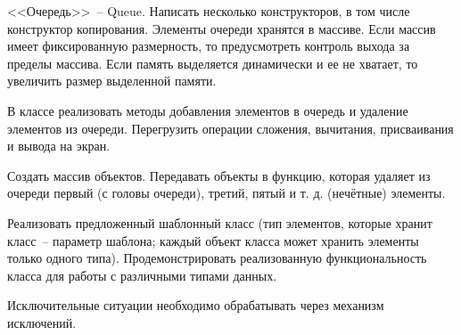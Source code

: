 
<<Очередь>>~-- Queue. Написать несколько конструкторов, в том числе конструктор
копирования. Элементы очереди хранятся в массиве. Если массив имеет фиксированную
размерность, то предусмотреть контроль выхода за пределы массива. Если память
выделяется динамически и ее не хватает, то увеличить размер выделенной памяти.

В
классе реализовать методы добавления элементов в очередь и удаление элементов из
очереди. Перегрузить операции сложения, вычитания, присваивания и вывода на экран.

Создать массив объектов. Передавать объекты в функцию, которая удаляет из очереди
первый (с головы очереди), третий, пятый и т. д. (нечётные) элементы.

Реализовать предложенный шаблонный класс (тип элементов, которые
хранит класс~-- параметр шаблона; каждый объект класса может хранить
элементы только одного типа). Продемонстрировать реализованную
функциональность класса для работы с различными типами данных.


Исключительные ситуации необходимо обрабатывать через механизм исключений.
